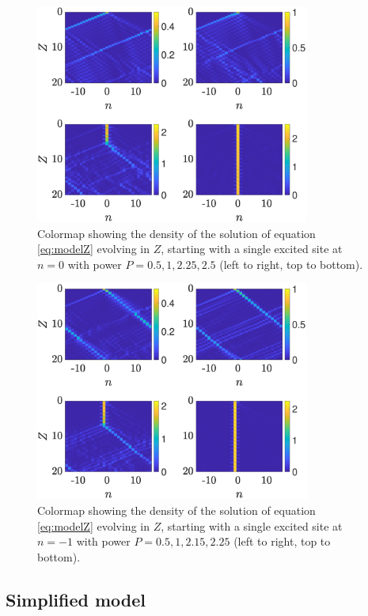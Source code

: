 \documentclass[reprint, amsmath,amssymb,aps,pre]{revtex4-2}
\begin{document}
\begin{figure}
    \centering
    \includegraphics[width=9cm]{timestep0.eps}
    \caption{Colormap showing the density of the solution of equation \cref{eq:modelZ} evolving in $Z$, starting with a single excited site at $n=0$ with power $P=0.5,1,2.25,2.5$ (left to right, top to bottom). }
    \label{fig:timestep0}
\end{figure}

\begin{figure}
    \centering
    \includegraphics[width=9cm]{timestep-1.eps}
    \caption{Colormap showing the density of the solution of equation \cref{eq:modelZ} evolving in $Z$, starting with a single excited site at $n=-1$ with power $P=0.5,1,2.15,2.25$ (left to right, top to bottom).}
    \label{fig:timestep-1}
\end{figure}

\subsection{Simplified model}\label{sec:simplified}
\end{document}
